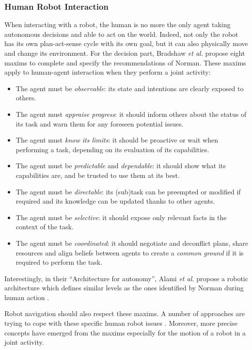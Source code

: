 \documentclass[a4paper,11pt,twoside]{StyleThese}
\begin{document}
\subsubsection{Human Robot Interaction}
When interacting with a robot, the human is no more the only agent taking autonomous decisions and able to act on the world. Indeed, not only the robot has its own plan-act-sense cycle with its own goal, but it can also physically move and change its environment. For the decision part, Bradshaw \textit{et al.} \cite{bradshaw2011human} propose eight maxims to complete and specify the recommendations of Norman. These maxims apply to human-agent interaction when they perform a joint activity:
\begin{itemize}
\item The agent must be \textit{observable}: its state and intentions are clearly exposed to others.
\item The agent must \textit{appraise progress}: it should inform others about the status of its task and warn them for any foreseen potential issues.
\item The agent must \textit{know its limits}: it should be proactive or wait when performing a task, depending on its evaluation of its capabilities.
\item The agent must be \textit{predictable} and \textit{dependable}: it should show what its capabilities are, and be trusted to use them at its best.
\item The agent must be \textit{directable}: its (sub)task can be preempted or modified if required and its knowledge can be updated thanks to other agents.
\item The agent must be \textit{selective}: it should expose only relevant facts in the context of the task.
\item The agent must be \textit{coordinated}: it should negotiate and deconflict plans, share resources and align beliefs between agents to create a \textit{common ground} if it is required to perform the task.
\end{itemize}

Interestingly, in their ``Architecture for autonomy'', Alami \textit{et al.} propose a robotic architecture which defines similar levels as the ones identified by Norman during human action \cite{alami1998architecture}.


Robot navigation should also respect these maxims. A number of approaches are trying to cope with these specific human robot issues \cite{kruse_human-aware_2013}. Moreover, more precise concepts have emerged from the maxims especially for the motion of a robot in a joint activity. 
\end{document}
